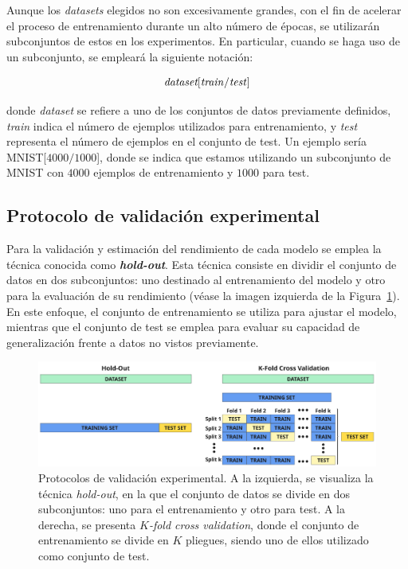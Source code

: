 Aunque los \textit{datasets} elegidos no son excesivamente grandes, con el fin de acelerar el proceso de entrenamiento durante un alto número de épocas, se utilizarán subconjuntos de estos en los experimentos. En particular, cuando se haga uso de un subconjunto, se empleará la siguiente notación:

\[
    \textit{dataset}[\text{\textit{train}/\textit{test}}]
\]

donde \textit{dataset} se refiere a uno de los conjuntos de datos previamente definidos, \textit{train} indica el número de ejemplos utilizados para entrenamiento, y \textit{test} representa el número de ejemplos en el conjunto de test. Un ejemplo sería MNIST[$4000/1000$], donde se indica que estamos utilizando un subconjunto de MNIST con $4000$ ejemplos de entrenamiento y $1000$ para test.

\subsection{Protocolo de validación experimental}\label{subsec:protocolo-experimental}

Para la validación y estimación del rendimiento de cada modelo se emplea la técnica conocida como \textbf{\textit{hold-out}}. Esta técnica consiste en dividir el conjunto de datos en dos subconjuntos: uno destinado al entrenamiento del modelo y otro para la evaluación de su rendimiento (véase la imagen izquierda de la Figura~\ref{fig:protocolos}). En este enfoque, el conjunto de entrenamiento se utiliza para ajustar el modelo, mientras que el conjunto de test se emplea para evaluar su capacidad de generalización frente a datos no vistos previamente. 

\begin{figure}[h]
    \centering
    \includegraphics[width=0.8\linewidth]{img/protocolo-experimental.png}
    \caption[Protocolos de validación experimental.]{Protocolos de validación experimental. A la izquierda, se visualiza la técnica \textit{hold-out}, en la que el conjunto de datos se divide en dos subconjuntos: uno para el entrenamiento y otro para test. A la derecha, se presenta \textit{$K$-fold cross validation}, donde el conjunto de entrenamiento se divide en $K$ pliegues, siendo uno de ellos utilizado como conjunto de test.}\label{fig:protocolos}
\end{figure}

